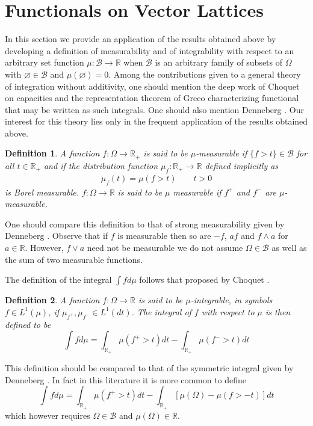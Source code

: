 \documentclass[11pt]{amsart}
\theoremstyle{plain}
\newtheorem{definition}{Definition}
\begin{document}
\section{Functionals on Vector Lattices}
\label{sec choquet}

In this section we provide an application of the results obtained above by developing 
a definition of measurability and of integrability with respect to an arbitrary set function 
$\mu:\mathscr B\to{\mathbb{R}}$ when $\mathscr B$ is an arbitrary family of subsets of $\Omega$
with ${\varnothing}\in\mathscr B$ and $\mu({\varnothing})=0$. 
Among the contributions given to a general theory of integration without additivity, one 
should mention the deep work of Choquet \cite{choquet} on capacities and the 
representation theorem of Greco \cite{greco} characterizing functional that may be written 
as such integrals. One should also mention Denneberg \cite{denneberg}. Our interest for 
this theory lies only in the frequent application of the results obtained above.

\begin{definition}
A function $f:\Omega\to{\mathbb{R}}_+$ is said to be $\mu$-measurable if 
$\{f>t\}\in\mathscr B$ for all $t\in{\mathbb{R}}_+$ and if the distribution function
$\mu_f:{\mathbb{R}}_+\to{\mathbb{R}}$ defined implicitly as
\begin{align}
\label{m+,m-}
\mu_f(t)=\mu(f>t)
\qquad t>0
\end{align}
is Borel measurable. $f:\Omega\to{\mathbb{R}}$ is said to be  $\mu$ measurable if
$f^+$ and $f^-$ are $\mu$-measurable.
\end{definition}

One should compare this definition to that of strong measurability given by 
Denneberg \cite[p. 49]{denneberg}. Observe that if $f$ is measurable
then so are $-f$, $af$ and $f\wedge a$ for $a\in{\mathbb{R}}$. However, $f\vee a$ need not
be measurable we do not assume $\Omega\in\mathscr B$ as well as the sum
of two measurable functions.

The definition of the integral $\int fd\mu$ follows that proposed by Choquet 
\cite[]{choquet}.

\begin{definition}
A function $f:\Omega\to{\mathbb{R}}$ is said to be $\mu$-integrable, in symbols 
$f\in L^1(\mu)$, if $\mu_{f^+},\mu_{f^-}\in L^1(dt)$. The integral of $f$ with 
respect to $\mu$ is then defined to be
\begin{equation}
\label{integral}
\int fd\mu=\int_{{\mathbb{R}}_+}\mu(f^+>t)dt-\int_{{\mathbb{R}}_+}\mu(f^->t)dt
\end{equation}
\end{definition}
This definition should be compared to that of the symmetric integral given by
Denneberg \cite[Chapter 6]{denneberg}. In fact in this literature it is more common
to define
\begin{equation}
\int fd\mu=\int_{{\mathbb{R}}_+}\mu(f^+>t)dt-\int_{{\mathbb{R}}_+}[\mu(\Omega)-\mu(f>-t)]dt
\end{equation}
which however requires $\Omega\in\mathscr B$ and $\mu(\Omega)\in{\mathbb{R}}$.
\end{document}
